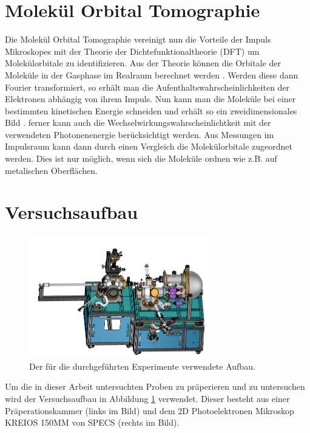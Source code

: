     \section{Molekül Orbital Tomographie} \label{sec:MOT}
        Die Molekül Orbital Tomographie vereinigt nun die Vorteile der Impuls Mikroskopes mit der Theorie der Dichtefunktionaltheorie (DFT) um Molekülorbitale zu identifizieren.
        Aus der Theorie können die Orbitale der Moleküle in der Gasphase im Realraum berechnet werden \cite{database}.
        Werden diese dann Fourier transformiert, so erhält man die Aufenthaltswahrscheinlichkeiten der Elektronen abhängig von ihrem Impuls.
        Nun kann man die Moleküle bei einer bestimmten kinetischen Energie schneiden und erhält so ein zweidimensionales Bild \cite{brandstetter_kmappy_2021}.
        ferner kann auch die Wechselwirkungswahrscheinlichtkeit mit der verwendeten Photonenenergie berücksichtigt werden.
        Aus Messungen im Impulsraum kann dann durch einen Vergleich die Molekülorbitale zugeordnet werden.
        Dies ist nur möglich, wenn sich die Moleküle ordnen wie z.B. auf metalischen Oberflächen.

    \section{Versuchsaufbau}
        \begin{figure}
            \centering
            \includegraphics[width=0.7\textwidth]{./content/MM.png}
            \caption{Der für die durchgeführten Experimente verwendete Aufbau.}
            \label{fig:aufbau}
        \end{figure}
        Um die in dieser Arbeit untersuchten Proben zu präperieren und zu untersuchen wird der Versuchsaufbau in Abbildung \ref{fig:aufbau} verwendet.
        Dieser besteht aus einer Präperationskammer (links im Bild) und dem 2D Photoelektronen Mikroskop KREIOS 150MM von SPECS (rechts im Bild).


